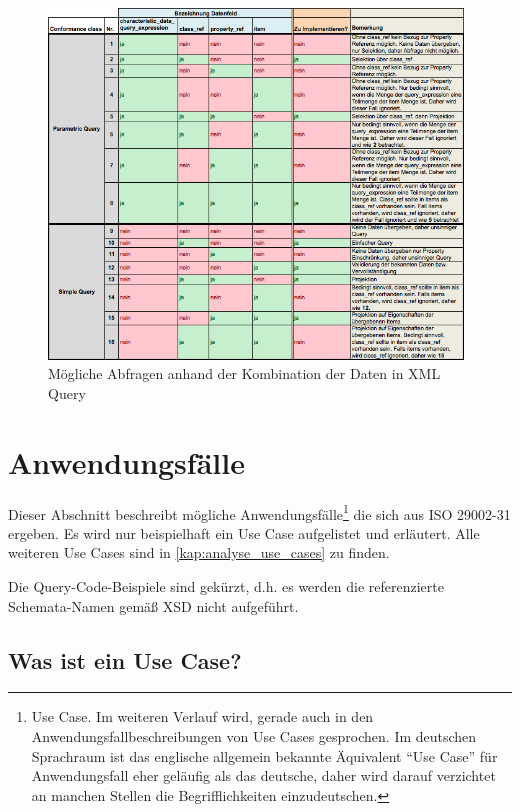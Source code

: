 \begin{figure}[htbp]
	\centering
		\includegraphics[width=0.98\textwidth]{images/queries.png}
	\caption{Mögliche Abfragen anhand der Kombination der Daten in XML Query}
	\label{fig:query_kombinationen}
\end{figure}

\section{Anwendungsfälle}\label{kap:Use_Cases}

Dieser Abschnitt beschreibt mögliche Anwendungsfälle\footnote{Use Case. Im weiteren Verlauf wird, gerade auch in den Anwendungsfallbeschreibungen von Use Cases gesprochen. Im deutschen Sprachraum ist das englische allgemein bekannte Äquivalent \enquote{Use Case} für Anwendungsfall eher geläufig als das deutsche, daher wird darauf verzichtet an manchen Stellen die Begrifflichkeiten einzudeutschen.} die sich aus ISO 29002-31 ergeben. 
Es wird nur beispielhaft ein Use Case aufgelistet und erläutert. Alle weiteren Use Cases sind in \autoref{kap:analyse_use_cases} zu finden. 

Die Query-Code-Beispiele sind gekürzt, d.h. es werden die referenzierte Schemata-Namen gemäß XSD nicht aufgeführt. 

\subsection{Was ist ein Use Case?}


